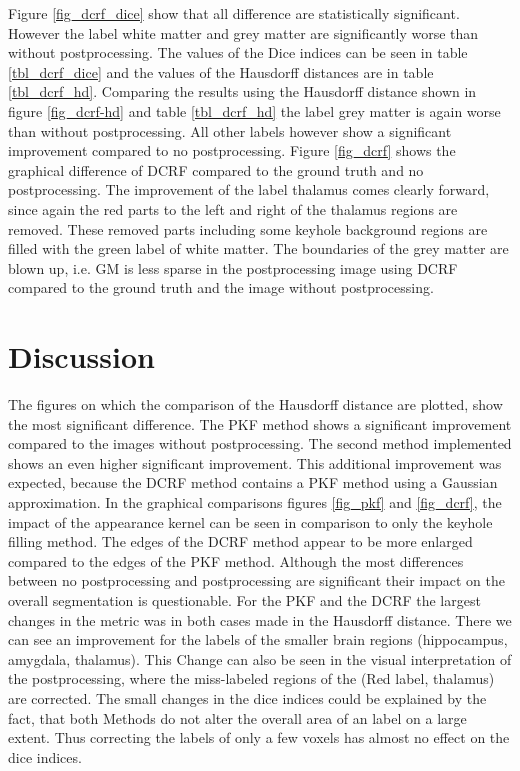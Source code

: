 \documentclass[journal]{IEEEtran}
\begin{document}
Figure \ref{fig_dcrf_dice} show that all difference are statistically significant. However the label white matter and grey matter are significantly worse than without postprocessing.
The values of the Dice indices can be seen in table \ref{tbl_dcrf_dice} and the values of the Hausdorff distances are in table \ref{tbl_dcrf_hd}.
Comparing the results using the Hausdorff distance shown in figure \ref{fig_dcrf-hd} and table \ref{tbl_dcrf_hd} the label grey matter is again worse than without postprocessing. All other labels however show a significant improvement compared to no postprocessing. 
Figure \ref{fig_dcrf} shows the graphical difference of DCRF compared to the ground truth and no postprocessing. The improvement of the label thalamus comes clearly forward, since again the red parts to the left and right of the thalamus regions are removed. These removed parts including some keyhole background regions are filled with the green label of white matter. 
The boundaries of the grey matter are blown up, i.e. GM is less sparse in the postprocessing image using DCRF compared to the ground truth and the image without postprocessing.

\twocolumn
\section{Discussion}
The figures on which the comparison of the Hausdorff distance are plotted, show the most significant difference. The PKF method shows a significant improvement compared to the images without postprocessing. The second method implemented shows an even higher significant improvement. This additional improvement was expected, because the DCRF method contains a PKF method using a Gaussian approximation. In the graphical comparisons figures \ref{fig_pkf} and \ref{fig_dcrf}, the impact of the appearance kernel can be seen in comparison to only the keyhole filling method. The edges of the DCRF method appear to be more enlarged compared to the edges of the PKF method.
Although the most differences between no postprocessing and postprocessing are significant their impact on the overall segmentation is questionable. For the PKF and the DCRF the largest changes in the metric was in both cases made in the Hausdorff distance. There we can see an improvement for the labels of the smaller brain regions (hippocampus, amygdala, thalamus). This Change can also be seen in the visual interpretation of the postprocessing, where the miss-labeled regions of the (Red label, thalamus) are corrected. The small changes in the dice indices could be explained by the fact, that both Methods do not alter the overall area of an label on a large extent. Thus correcting the labels of only a few voxels has almost no effect on the dice indices.
\end{document}
